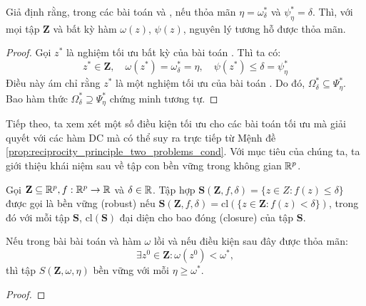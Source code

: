 \documentclass[a4paper]{report}
\begin{document}
    \begin{proposition}
        \label{prop:reciprocity_principle_two_problems_cond}
        Giả định rằng, trong các bài toán  và , nếu thỏa mãn $\eta = \omega_{\delta}^*$ và $\psi_{\eta}^* = \delta$. Thì, với mọi tập $\mathbf{Z}$ và bất kỳ hàm $\omega(z)$, $\psi(z)$, nguyên lý tương hỗ được thỏa mãn.
    \end{proposition}
    \begin{proof}
        Gọi $z^*$ là nghiệm tối ưu bất kỳ của bài toán . Thì ta có:
        \begin{equation}
            z^* \in \mathbf{Z},\quad \omega(z^*) = \omega_\delta^* = \eta, \quad \psi(z^*) \leq \delta = \psi_\eta^*
        \end{equation}
        Điều này ám chỉ rằng $z^*$ là một nghiệm tối ưu của bài toán . Do đó, $\Omega_\delta^* \subseteq \Psi_\eta^*$. Bao hàm thức $\Omega_\delta^* \supseteq \Psi_\eta^*$ chứng minh tương tự.
    \end{proof}
    Tiếp theo, ta xem xét một số điều kiện tối ưu cho các bài toán tối ưu mà giải quyết với các hàm DC mà có thể suy ra trực tiếp từ Mệnh đề \ref{prop:reciprocity_principle_two_problems_cond}. Với mục tiêu của chúng ta, ta giới thiệu khái niệm sau về tập con bền vững trong không gian $\mathbb{R}^p$.
    
    \begin{definition}
        \label{def:robust}
        Gọi $\mathbf{Z} \subseteq \mathbb{R}^p, f: \mathbb{R}^p \rightarrow \mathbb{R}$ và $\delta \in \mathbb{R}$. Tập hợp $\mathbf{S}(\mathbf{Z}, f, \delta) = \{z \in {Z}: f(z) \leq \delta\}$ được gọi là bền vững (robust) nếu $\mathbf{S}(\mathbf{Z}, f, \delta) = \text{cl}(\{z \in \mathbf{Z}: f(z) < \delta\})$, trong đó với mỗi tập $\mathbf{S}$, $\text{cl}(\mathbf{S})$ đại diện cho bao đóng (closure) của tập $\mathbf{S}$.
    \end{definition}

    \begin{lemma}
        \label{lemma:robust_cond}
        Nếu trong bài bài toán  và  hàm $\omega$ lồi và nếu điều kiện sau đây được thỏa mãn:
        \begin{equation}
            \label{eq:robust_cond}
            \exists z^0 \in \mathbf{Z}: \omega(z^0) < \omega^*,
        \end{equation}
        thì tập $S(\mathbf{Z}, \omega, \eta)$ bền vững với mỗi $\eta \geq \omega^*$.
    \end{lemma}
    \begin{proof}
        
    \end{proof}
\end{document}

